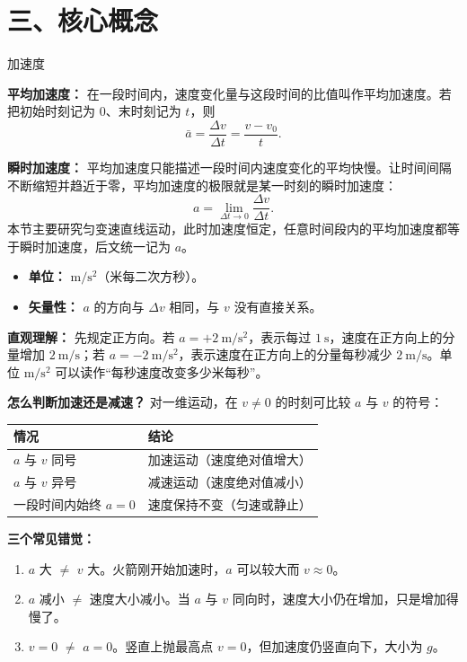 \section*{三、核心概念}

\begin{conceptbox}{加速度}

\textbf{平均加速度：} 在一段时间内，速度变化量与这段时间的比值叫作平均加速度。若把初始时刻记为 $0$、末时刻记为 $t$，则
\[
\bar a = \frac{\Delta v}{\Delta t} = \frac{v - v_0}{t}.
\]

\textbf{瞬时加速度：} 平均加速度只能描述一段时间内速度变化的平均快慢。让时间间隔不断缩短并趋近于零，平均加速度的极限就是某一时刻的瞬时加速度：
\[
a=\lim_{\Delta t\to0}\frac{\Delta v}{\Delta t}.
\]
本节主要研究匀变速直线运动，此时加速度恒定，任意时间段内的平均加速度都等于瞬时加速度，后文统一记为 $a$。

\begin{itemize}
  \item \textbf{单位：} $\mathrm{m/s^2}$（米每二次方秒）。
  \item \textbf{矢量性：} $a$ 的方向与 $\Delta v$ 相同，与 $v$ 没有直接关系。
\end{itemize}

\begin{center}


\label{fig:acceleration-vector-change}
\end{center}

\textbf{直观理解：} 先规定正方向。若 $a = +2\ \mathrm{m/s^2}$，表示每过 $1\ \mathrm{s}$，速度在正方向上的分量增加 $2\ \mathrm{m/s}$；若 $a = -2\ \mathrm{m/s^2}$，表示速度在正方向上的分量每秒减少 $2\ \mathrm{m/s}$。单位 $\mathrm{m/s^2}$ 可以读作“每秒速度改变多少米每秒”。

\textbf{怎么判断加速还是减速？} 对一维运动，在 $v\neq0$ 的时刻可比较 $a$ 与 $v$ 的符号：
\begin{center}
\begin{tabular}{ll}
\toprule
情况 & 结论 \\
\midrule
$a$ 与 $v$ 同号 & 加速运动（速度绝对值增大） \\
$a$ 与 $v$ 异号 & 减速运动（速度绝对值减小） \\
一段时间内始终 $a = 0$ & 速度保持不变（匀速或静止） \\
\bottomrule
\end{tabular}
\end{center}

\textbf{三个常见错觉：}
\begin{enumerate}
  \item $a$ 大 $\neq$ $v$ 大。火箭刚开始加速时，$a$ 可以较大而 $v\approx 0$。
  \item $a$ 减小 $\neq$ 速度大小减小。当 $a$ 与 $v$ 同向时，速度大小仍在增加，只是增加得慢了。
  \item $v=0$ $\neq$ $a=0$。竖直上抛最高点 $v=0$，但加速度仍竖直向下，大小为 $g$。
\end{enumerate}

\end{conceptbox}

